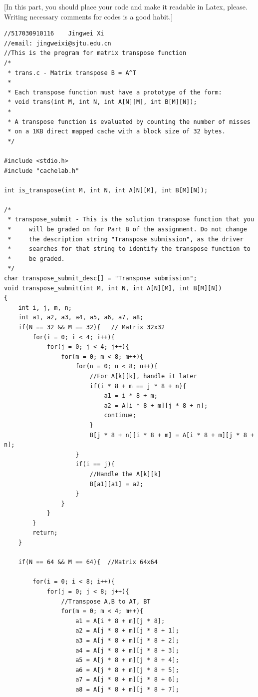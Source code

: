 \documentclass{article}
\begin{document}
[In this part, you should place your code and make it readable in Latex, please. Writing necessary comments for codes is a good habit.]
\begin{lstlisting}[title=trans.c, frame=shadowbox]
//517030910116    Jingwei Xi
//email: jingweixi@sjtu.edu.cn
//This is the program for matrix transpose function
/* 
 * trans.c - Matrix transpose B = A^T
 *
 * Each transpose function must have a prototype of the form:
 * void trans(int M, int N, int A[N][M], int B[M][N]);
 *
 * A transpose function is evaluated by counting the number of misses
 * on a 1KB direct mapped cache with a block size of 32 bytes.
 */ 

#include <stdio.h>
#include "cachelab.h"

int is_transpose(int M, int N, int A[N][M], int B[M][N]);

/* 
 * transpose_submit - This is the solution transpose function that you
 *     will be graded on for Part B of the assignment. Do not change
 *     the description string "Transpose submission", as the driver
 *     searches for that string to identify the transpose function to
 *     be graded. 
 */
char transpose_submit_desc[] = "Transpose submission";
void transpose_submit(int M, int N, int A[N][M], int B[M][N])
{
    int i, j, m, n;
    int a1, a2, a3, a4, a5, a6, a7, a8;
    if(N == 32 && M == 32){   // Matrix 32x32
        for(i = 0; i < 4; i++){
            for(j = 0; j < 4; j++){
                for(m = 0; m < 8; m++){
                    for(n = 0; n < 8; n++){
                        //For A[k][k], handle it later
                        if(i * 8 + m == j * 8 + n){
                            a1 = i * 8 + m;
                            a2 = A[i * 8 + m][j * 8 + n];
                            continue;
                        }
                        B[j * 8 + n][i * 8 + m] = A[i * 8 + m][j * 8 + n];
                    }
                    if(i == j){
                        //Handle the A[k][k]
                        B[a1][a1] = a2;  
                    }
                }
            }
        }
        return;
    }

    if(N == 64 && M == 64){  //Matrix 64x64
        
        for(i = 0; i < 8; i++){
            for(j = 0; j < 8; j++){
                //Transpose A,B to AT, BT
                for(m = 0; m < 4; m++){
                    a1 = A[i * 8 + m][j * 8]; 
                    a2 = A[j * 8 + m][j * 8 + 1];
                    a3 = A[j * 8 + m][j * 8 + 2]; 
                    a4 = A[j * 8 + m][j * 8 + 3];
                    a5 = A[j * 8 + m][j * 8 + 4]; 
                    a6 = A[j * 8 + m][j * 8 + 5];
                    a7 = A[j * 8 + m][j * 8 + 6]; 
                    a8 = A[j * 8 + m][j * 8 + 7];


\end{lstlisting}
\end{document}
